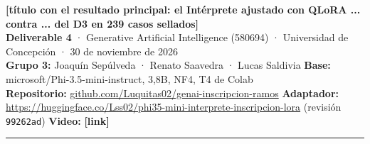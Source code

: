 \documentclass[9pt,a4paper]{extarticle}
\newcommand{\cod}[1]{{\ttfamily\small #1}}
\newcommand{\PEND}[1]{{\color{red}\bfseries[#1]}}
\begin{document}
\raggedright

{\Large\bfseries \PEND{título con el resultado principal: el Intérprete ajustado con QLoRA ... contra ... del D3 en 239 casos sellados}}\\[0.8mm]
{\footnotesize\color{gris}%
\textbf{Deliverable 4} · Generative Artificial Intelligence (580694) · Universidad de Concepción · 30 de noviembre de 2026\\
\textbf{Grupo 3:} Joaquín Sepúlveda · Renato Saavedra · Lucas Saldivia \quad\textbullet\quad
\textbf{Base:} \cod{microsoft/Phi-3.5-mini-instruct}, 3,8B, NF4, T4 de Colab\\
\textbf{Repositorio:} \href{https://github.com/Luquitas02/genai-inscripcion-ramos}{\cod{github.com/Luquitas02/genai-inscripcion-ramos}} \quad\textbullet\quad
\textbf{Adaptador:} {\small\url{https://huggingface.co/Lss02/phi35-mini-interprete-inscripcion-lora}} (revisión \texttt{99262ad}) \quad\textbullet\quad
\textbf{Video:} \PEND{link}}

\vspace{1mm}
{\color{linea}\rule{\textwidth}{0.4pt}}
\vspace{0.5mm}
\end{document}
